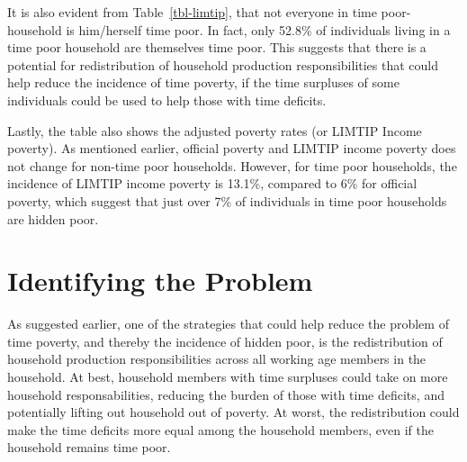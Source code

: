 \documentclass[
  11pt,
]{article}
\begin{document}
It is also evident from Table~\ref{tbl-limtip}, that not everyone in
time poor-household is him/herself time poor. In fact, only 52.8\% of
individuals living in a time poor household are themselves time poor.
This suggests that there is a potential for redistribution of household
production responsibilities that could help reduce the incidence of time
poverty, if the time surpluses of some individuals could be used to help
those with time deficits.

Lastly, the table also shows the adjusted poverty rates (or LIMTIP
Income poverty). As mentioned earlier, official poverty and LIMTIP
income poverty does not change for non-time poor households. However,
for time poor households, the incidence of LIMTIP income poverty is
13.1\%, compared to 6\% for official poverty, which suggest that just
over 7\% of individuals in time poor households are hidden poor.

\begin{table}[H]

\caption{\label{tbl-limtip}Poverty Rates by Household Time Poverty
Status}


\end{table}%

\section{Identifying the Problem}\label{sec-problem}

As suggested earlier, one of the strategies that could help reduce the
problem of time poverty, and thereby the incidence of hidden poor, is
the redistribution of household production responsibilities across all
working age members in the household. At best, household members with
time surpluses could take on more household responsabilities, reducing
the burden of those with time deficits, and potentially lifting out
household out of poverty. At worst, the redistribution could make the
time deficits more equal among the household members, even if the
household remains time poor.
\end{document}
